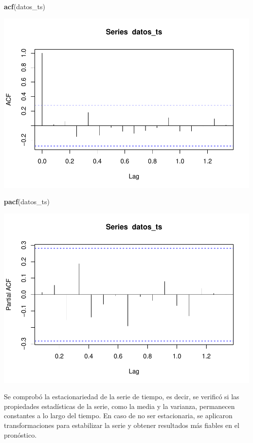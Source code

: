 \documentclass[
]{book}
\newenvironment{Shaded}{\begin{snugshade}}{\end{snugshade}}
\newcommand{\FunctionTok}[1]{\textcolor[rgb]{0.13,0.29,0.53}{\textbf{#1}}}
\newcommand{\NormalTok}[1]{#1}
\begin{document}
\begin{Shaded}
\begin{Highlighting}[]
\FunctionTok{acf}\NormalTok{(datos\_ts)  }
\end{Highlighting}
\end{Shaded}

\includegraphics{_main_files/figure-latex/unnamed-chunk-28-2.pdf}

\begin{Shaded}
\begin{Highlighting}[]
\FunctionTok{pacf}\NormalTok{(datos\_ts) }
\end{Highlighting}
\end{Shaded}

\includegraphics{_main_files/figure-latex/unnamed-chunk-28-3.pdf}

Se comprobó la estacionariedad de la serie de tiempo, es decir, se verificó si las propiedades estadísticas de la serie, como la media y la varianza, permanecen constantes a lo largo del tiempo. En caso de no ser estacionaria, se aplicaron transformaciones para estabilizar la serie y obtener resultados más fiables en el pronóstico.
\end{document}

